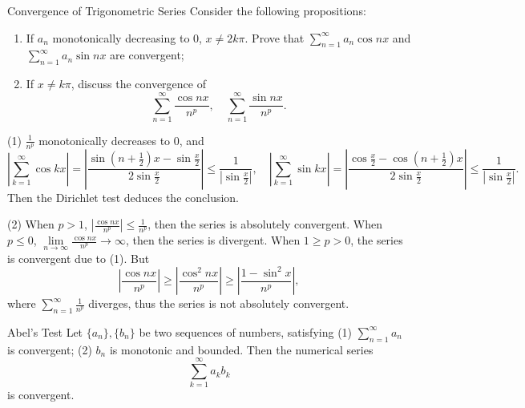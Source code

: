 \begin{example}{Convergence of Trigonometric Series}{}
  Consider the following propositions:
  \begin{enumerate}
  \item If $a_n$ monotonically decreasing to $0$, $x \neq 2k\pi$.
    Prove that $\sum\limits_{n = 1}^{\infty} a_n \cos nx$ and $\sum\limits_{n =
      1}^{\infty} a_n \sin nx$ are convergent;
  \item If $x \neq k\pi$, discuss the convergence of
    \begin{equation}
      \sum\limits_{n = 1}^{\infty} \frac{\cos nx}{n^p}, \quad
      \sum\limits_{n = 1}^{\infty} \frac{\sin nx}{n^p}.
    \end{equation}
  \end{enumerate}
\end{example}

\begin{solution}
  (1) $\frac{1}{n^p}$ monotonically decreases to $0$, and
  \begin{equation}
    \left|\sum\limits_{k = 1}^{\infty} \cos kx\right|
    = \left|\frac{\sin (n + \frac{1}{2})x - \sin \frac{x}{2}}{2 \sin \frac{x}{2}}\right|
    \leq \frac{1}{|\sin \frac{x}{2}|}, \quad
    \left|\sum\limits_{k = 1}^{\infty} \sin kx \right|
    = \left| \frac{\cos \frac{x}{2} - \cos (n + \frac{1}{2})x}{2 \sin \frac{x}{2}} \right|
    \leq \frac{1}{|\sin \frac{x}{2}|}.
  \end{equation}
  Then the Dirichlet test deduces the conclusion.

  (2) When $p > 1$, $\left| \frac{\cos nx}{n^p} \right| \leq \frac{1}{n^p}$,
  then the series is absolutely convergent.
  When $p \leq 0$, $\lim \limits _{n \rightarrow \infty} \frac{\cos nx}{n^p}
  \rightarrow \infty$, then the series is divergent.
  When $1 \geq p > 0$, the series is convergent due to (1).
  But 
  \begin{equation}
    \left| \frac{\cos nx}{n^p} \right|
    \geq \left| \frac{\cos^2 nx}{n^p} \right|
    \geq \left| \frac{1 - \sin^2 x}{n^p} \right|,
  \end{equation}
  where $\sum\limits_{n = 1}^{\infty} \frac{1}{n^p}$ diverges,
  thus the series is not absolutely convergent.
\end{solution}

\begin{theorem}{Abel's Test}{}
  Let $\{a_n\}, \{b_n\}$ be two sequences of numbers,
  satisfying
  (1) $\sum\limits_{n = 1}^{\infty}a_n$ is convergent;
  (2) $b_n$ is monotonic and bounded.
  Then the numerical series
  \begin{equation}
    \sum\limits_{k = 1}^{\infty} a_kb_k
  \end{equation}
  is convergent.
\end{theorem}


